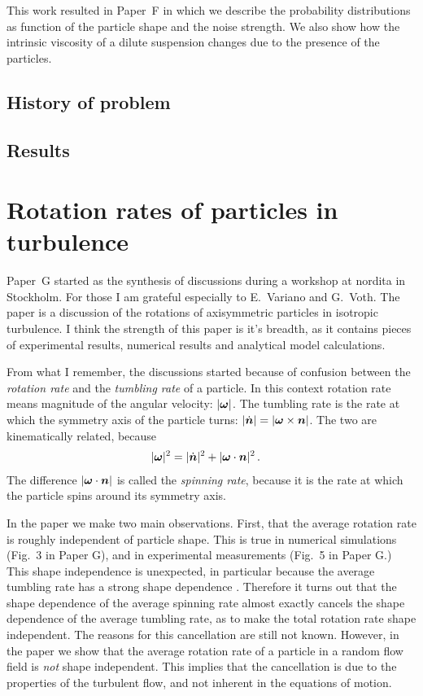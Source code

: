 \documentclass[thesis.tex]{subfiles}
\begin{document}
This work resulted in Paper~F in which we describe the probability distributions as function of the particle shape and the noise strength. We also show how the intrinsic viscosity of a dilute suspension changes due to the presence of the particles.

\section{History of problem}




\section{Results}

\chapter{Rotation rates of particles in turbulence}
Paper~G started as the synthesis of discussions during a workshop at {\sc nordita} in Stockholm. For those I am grateful especially to E.~Variano and G.~Voth. The paper is a discussion of the rotations of axisymmetric particles in isotropic turbulence. I think the strength of this paper is it's breadth, as it contains pieces of experimental results, numerical results and analytical model calculations.

From what I remember, the discussions started because of confusion between the \emph{rotation rate} and the \emph{tumbling rate} of a particle. In this context rotation rate means magnitude of the angular velocity: $|\mbox{\boldmath$\omega$}|$. The tumbling rate is the rate at which the symmetry axis of the particle turns: $|\dot{\mbox{\boldmath$n$}}|=|\mbox{\boldmath$\omega$} \times \mbox{\boldmath$n$}|$. The two are kinematically related, because
\begin{align}
    |\mbox{\boldmath$\omega$}|^2 &= |\dot{\mbox{\boldmath$n$}}|^2 + |\mbox{\boldmath$\omega$} \cdot \mbox{\boldmath$n$}|^2\,.
\end{align}
The difference $|\mbox{\boldmath$\omega$} \cdot \mbox{\boldmath$n$}|$ is called the \emph{spinning rate}, because it is the rate at which the particle spins around its symmetry axis.

In the paper we make two main observations. First, that the average rotation rate is roughly independent of particle shape. This is true in numerical simulations (Fig.~3 in Paper G), and in experimental measurements (Fig.~5 in Paper G.) This shape independence is unexpected, in particular because the average tumbling rate has a strong shape dependence \cite{parsa2012,gustavsson2014}. Therefore it turns out that the shape dependence of the average spinning rate almost exactly cancels the shape dependence of the average tumbling rate, as to make the total rotation rate shape independent. The reasons for this cancellation are still not known. However, in the paper we show that the average rotation rate of a particle in a random flow field is \emph{not} shape independent. This implies that the cancellation is due to the properties of the turbulent flow, and not inherent in the equations of motion.
\end{document}
